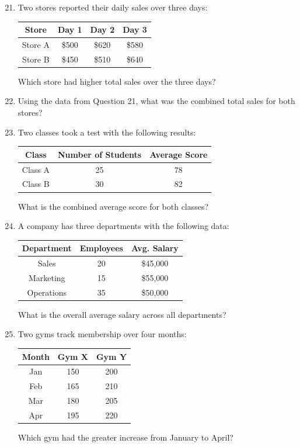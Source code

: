 \documentclass[12pt,a4paper]{article}
\begin{document}
\begin{enumerate}
\setcounter{enumi}{20}

\item Two stores reported their daily sales over three days:
\begin{center}
\begin{tabular}{|c|c|c|c|}
\hline
Store & Day 1 & Day 2 & Day 3 \\
\hline
Store A & \$500 & \$620 & \$580 \\
Store B & \$450 & \$510 & \$640 \\
\hline
\end{tabular}
\end{center}
Which store had higher total sales over the three days?

\item Using the data from Question 21, what was the combined total sales for both stores?

\item Two classes took a test with the following results:
\begin{center}
\begin{tabular}{|c|c|c|}
\hline
Class & Number of Students & Average Score \\
\hline
Class A & 25 & 78 \\
Class B & 30 & 82 \\
\hline
\end{tabular}
\end{center}
What is the combined average score for both classes?

\item A company has three departments with the following data:
\begin{center}
\begin{tabular}{|c|c|c|}
\hline
Department & Employees & Avg. Salary \\
\hline
Sales & 20 & \$45,000 \\
Marketing & 15 & \$55,000 \\
Operations & 35 & \$50,000 \\
\hline
\end{tabular}
\end{center}
What is the overall average salary across all departments?

\item Two gyms track membership over four months:
\begin{center}
\begin{tabular}{|c|c|c|}
\hline
Month & Gym X & Gym Y \\
\hline
Jan & 150 & 200 \\
Feb & 165 & 210 \\
Mar & 180 & 205 \\
Apr & 195 & 220 \\
\hline
\end{tabular}
\end{center}
Which gym had the greater increase from January to April?


\end{enumerate}
\end{document}
